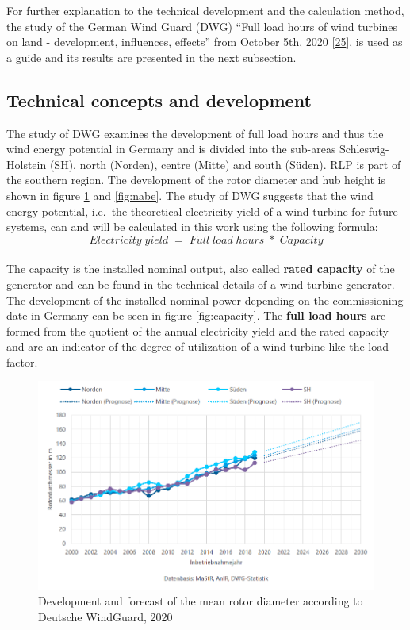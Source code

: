 \documentclass[a4paper,11pt]{article}
\begin{document}
For further explanation to the technical development and the calculation method, the study of the German Wind Guard (DWG) ``Full load hours of wind turbines on land - development, influences, effects'' from October 5th, 2020 {[}\protect\hyperlink{ref-RasmusBorrmannDr.KnudRehfeldtDr.DennisKruse.2020}{25}{]}, is used as a guide and its results are presented in the next subsection.

\hypertarget{technical-concepts-and-development}{%
\subsection{Technical concepts and development}\label{technical-concepts-and-development}}

The study of DWG examines the development of full load hours and thus the wind energy potential in Germany and is divided into the sub-areas Schleswig-Holstein (SH), north (Norden), centre (Mitte) and south (Süden). RLP is part of the southern region. The development of the rotor diameter and hub height is shown in figure \ref{fig:rotor} and \ref{fig:nabe}. The study of DWG suggests that the wind energy potential, i.e.~the theoretical electricity yield of a wind turbine for future systems, can and will be calculated in this work using the following formula:
\[
Electricity\;yield\; =\; Full\;load\;hours\; *\; Capacity
\]\\
The capacity is the installed nominal output, also called \textbf{rated capacity} of the generator and can be found in the technical details of a wind turbine generator. The development of the installed nominal power depending on the commissioning date in Germany can be seen in figure \ref{fig:capacity}. The \textbf{full load hours} are formed from the quotient of the annual electricity yield and the rated capacity and are an indicator of the degree of utilization of a wind turbine like the load factor.
\begin{figure}

{\centering \includegraphics[width=1\linewidth]{figures/DWG/DWG_Rotordurchmesser} 

}

\caption{Development and forecast of the mean rotor diameter according to Deutsche WindGuard, 2020}\label{fig:rotor}
\end{figure}
\end{document}
